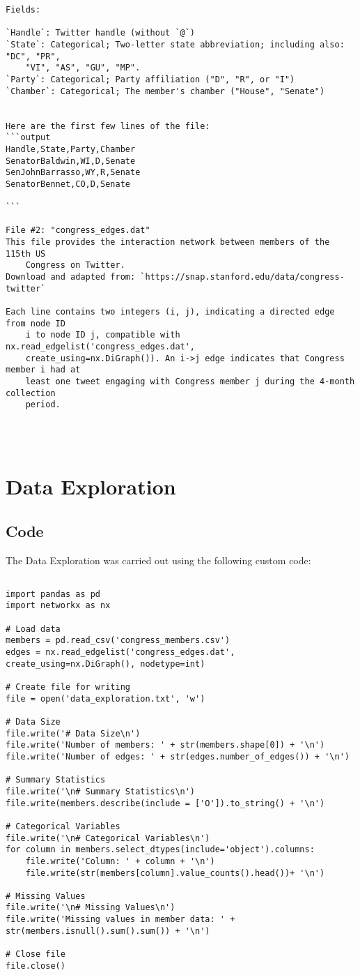 \documentclass[11pt]{article}
\begin{document}
\begin{Verbatim}[tabsize=4]
Fields:

`Handle`: Twitter handle (without `@`)
`State`: Categorical; Two-letter state abbreviation; including also: "DC", "PR",
	"VI", "AS", "GU", "MP".
`Party`: Categorical; Party affiliation ("D", "R", or "I")
`Chamber`: Categorical; The member's chamber ("House", "Senate")


Here are the first few lines of the file:
```output
Handle,State,Party,Chamber
SenatorBaldwin,WI,D,Senate
SenJohnBarrasso,WY,R,Senate
SenatorBennet,CO,D,Senate

```

File #2: "congress_edges.dat"
This file provides the interaction network between members of the 115th US
	Congress on Twitter.
Download and adapted from: `https://snap.stanford.edu/data/congress-twitter`

Each line contains two integers (i, j), indicating a directed edge from node ID
	i to node ID j, compatible with nx.read_edgelist('congress_edges.dat',
	create_using=nx.DiGraph()). An i->j edge indicates that Congress member i had at
	least one tweet engaging with Congress member j during the 4-month collection
	period.




\end{Verbatim}

\section{Data Exploration}
\subsection{{Code}}
The Data Exploration was carried out using the following custom code:

\begin{verbatim}

import pandas as pd
import networkx as nx

# Load data
members = pd.read_csv('congress_members.csv')
edges = nx.read_edgelist('congress_edges.dat', create_using=nx.DiGraph(), nodetype=int)

# Create file for writing
file = open('data_exploration.txt', 'w')

# Data Size
file.write('# Data Size\n')
file.write('Number of members: ' + str(members.shape[0]) + '\n')
file.write('Number of edges: ' + str(edges.number_of_edges()) + '\n')

# Summary Statistics
file.write('\n# Summary Statistics\n')
file.write(members.describe(include = ['O']).to_string() + '\n')

# Categorical Variables
file.write('\n# Categorical Variables\n')
for column in members.select_dtypes(include='object').columns:
    file.write('Column: ' + column + '\n')
    file.write(str(members[column].value_counts().head())+ '\n')

# Missing Values
file.write('\n# Missing Values\n')
file.write('Missing values in member data: ' + str(members.isnull().sum().sum()) + '\n')

# Close file
file.close()

\end{verbatim}
\end{document}
